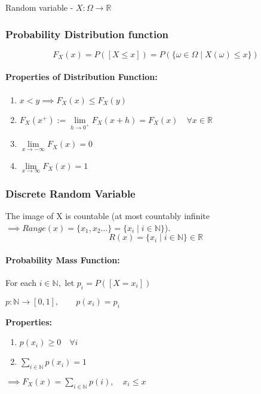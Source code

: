\documentclass[12pt]{article}
\begin{document}
Random variable - \quad $X: \Omega \rightarrow \mathbb{R}$ \newline

\subsubsection{Probability Distribution function}
\[F_X(x) = P([X\leq x]) = P( \{ \omega \in \Omega \mid X(\omega)\leq x\} ) \]

\paragraph{Properties of Distribution Function:}
\begin{enumerate}
    \item $ x<y \implies F_X(x) \leq F_X(y) $
    \item $F_X(x^{+}) := \lim\limits_{h\rightarrow 0^{+}} F_X(x+h) = F_X(x) \quad \forall x \in \mathbb{R}$
    \item $ \lim\limits_{x\rightarrow - \infty} F_X(x)=0 $
    \item $ \lim\limits_{x\rightarrow \infty} F_X(x)=1 $
\end{enumerate}

\subsubsection{Discrete Random Variable}
The image of X is countable (at most countably infinite $\implies Range(x)= \{ x_1, x_2 \dots \} = \{x_i \mid i \in \mathbb{N} \}$).
\[ R(x)= \{ x_i \mid i \in \mathbb{N}\} \in \mathbb{R}\]

\paragraph{Probability Mass Function:}
For each $i \in \mathbb{N},$ let $p_i = P([X=x_i])$

$p: \mathbb{N} \rightarrow [0,1], \quad \quad p(x_i) = p_i$ \newline

\textbf{Properties:}
\begin{enumerate}
    \item $p(x_i) \geq 0 \quad \forall i$
    \item $\sum\limits_{i \in \mathbb{N}}p(x_i) = 1$
\end{enumerate}


$\implies F_X(x) = \sum\limits_{i \in \mathbb{N}} p(i), \quad x_i \leq x$
\end{document}

